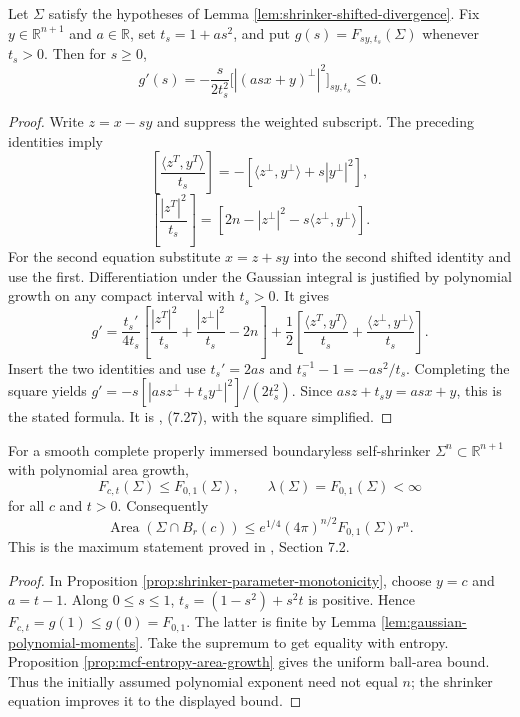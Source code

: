 \begin{proposition}\label{prop:shrinker-parameter-monotonicity}
Let $\Sigma$ satisfy the hypotheses of Lemma \ref{lem:shrinker-shifted-divergence}. Fix $y\in\mathbb R^{n+1}$ and $a\in\mathbb R$, set $t_s=1+as^2$, and put $g(s)=F_{sy,t_s}(\Sigma)$ whenever $t_s>0$. Then for $s\geq0$,
\[
 g'(s)=-\frac{s}{2t_s^2}
 \bigl[|(asx+y)^\perp|^2\bigr]_{sy,t_s}\leq0.
\]
\end{proposition}
\begin{proof}
Write $z=x-sy$ and suppress the weighted subscript. The preceding identities imply
\[
 \left[\frac{\langle z^T,y^T\rangle}{t_s}\right]
 =-[\langle z^\perp,y^\perp\rangle+s|y^\perp|^2],
\]
\[
 \left[\frac{|z^T|^2}{t_s}\right]
 =[2n-|z^\perp|^2-s\langle z^\perp,y^\perp\rangle].
\]
For the second equation substitute $x=z+sy$ into the second shifted identity and use the first. Differentiation under the Gaussian integral is justified by polynomial growth on any compact interval with $t_s>0$. It gives
\[
 g' =\frac{t_s'}{4t_s}
 \left[\frac{|z^T|^2}{t_s}+\frac{|z^\perp|^2}{t_s}-2n\right]
 +\frac12\left[\frac{\langle z^T,y^T\rangle}{t_s}
 +\frac{\langle z^\perp,y^\perp\rangle}{t_s}\right].
\]
Insert the two identities and use $t_s'=2as$ and $t_s^{-1}-1=-as^2/t_s$. Completing the square yields
$g'=-s[|as z^\perp+t_s y^\perp|^2]/(2t_s^2)$.
Since $as z+t_s y=asx+y$, this is the stated formula. It is \cite{CM12}, (7.27), with the square simplified.
\end{proof}

\begin{theorem}\label{thm:shrinker-entropy-maximum}
For a smooth complete properly immersed boundaryless self-shrinker $\Sigma^n\subset\mathbb R^{n+1}$ with polynomial area growth,
\[
 F_{c,t}(\Sigma)\leq F_{0,1}(\Sigma),\qquad
 \lambda(\Sigma)=F_{0,1}(\Sigma)<\infty
\]
for all $c$ and $t>0$. Consequently
\[
 \operatorname{Area}(\Sigma\cap B_r(c))
 \leq e^{1/4}(4\pi)^{n/2}F_{0,1}(\Sigma)r^n.
\]
This is the maximum statement proved in \cite{CM12}, Section 7.2.
\end{theorem}
\begin{proof}
In Proposition \ref{prop:shrinker-parameter-monotonicity}, choose $y=c$ and $a=t-1$. Along $0\leq s\leq1$, $t_s=(1-s^2)+s^2t$ is positive. Hence $F_{c,t}=g(1)\leq g(0)=F_{0,1}$. The latter is finite by Lemma \ref{lem:gaussian-polynomial-moments}. Take the supremum to get equality with entropy. Proposition \ref{prop:mcf-entropy-area-growth} gives the uniform ball-area bound. Thus the initially assumed polynomial exponent need not equal $n$; the shrinker equation improves it to the displayed bound.
\end{proof}

